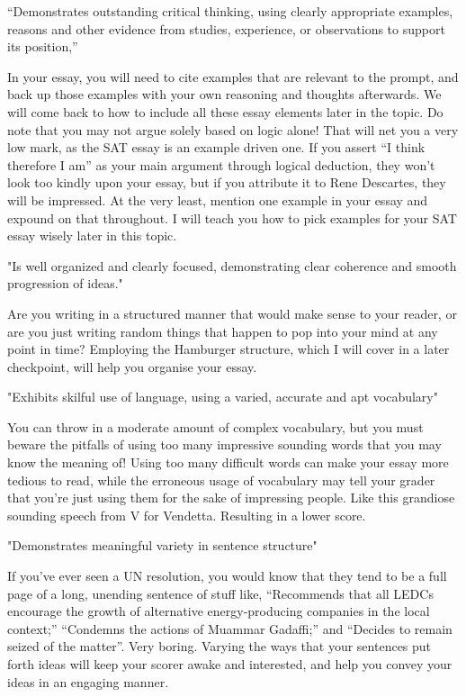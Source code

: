 “Demonstrates outstanding critical thinking, using clearly appropriate examples, reasons and other evidence from studies, experience, or observations to support its position,”

In your essay, you will need to cite examples that are relevant to the prompt, and back up those examples with your own reasoning and thoughts afterwards. We will come back to how to include all these essay elements later in the topic. Do note that you may not argue solely based on logic alone! That will net you a very low mark, as the SAT essay is an example driven one. If you assert “I think therefore I am” as your main argument through logical deduction, they won't look too kindly upon your essay, but if you attribute it to Rene Descartes, they will be impressed. At the very least, mention one example in your essay and expound on that throughout. I will teach you how to pick examples for your SAT essay wisely later in this topic.

"Is well organized and clearly focused, demonstrating clear coherence and smooth progression of ideas."

Are you writing in a structured manner that would make sense to your reader, or are you just writing random things that happen to pop into your mind at any point in time? Employing the Hamburger structure, which I will cover in a later checkpoint, will help you organise your essay.

"Exhibits skilful use of language, using a varied, accurate and apt vocabulary"

You can throw in a moderate amount of complex vocabulary, but you must beware the pitfalls of using too many impressive sounding words that you may know the meaning of! Using too many difficult words can make your essay more tedious to read, while the erroneous usage of vocabulary may tell your grader that you're just using them for the sake of impressing people. Like this grandiose sounding speech from V for Vendetta. Resulting in a lower score.

"Demonstrates meaningful variety in sentence structure"

If you've ever seen a UN resolution, you would know that they tend to be a full page of a long, unending sentence of stuff like, “Recommends that all LEDCs encourage the growth of alternative energy-producing companies in the local context;” “Condemns the actions of Muammar Gadaffi;” and “Decides to remain seized of the matter”. Very boring. Varying the ways that your sentences put forth ideas will keep your scorer awake and interested, and help you convey your ideas in an engaging manner.

